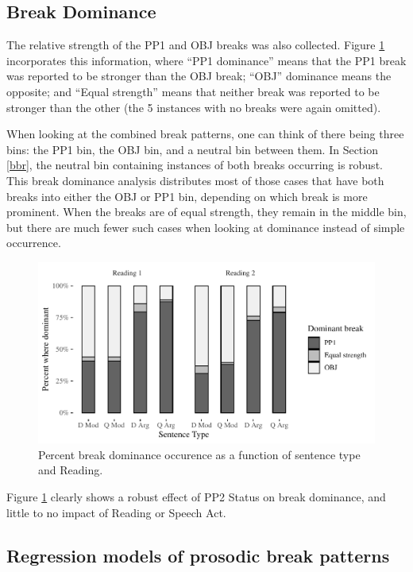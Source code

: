 \documentclass[12pt,oneside]{book}
\begin{document}
\hypertarget{break-dominance}{%
\subsection{Break Dominance}\label{break-dominance}}

The relative strength of the PP1 and OBJ breaks was also collected. Figure \ref{fig:bdom} incorporates this information, where ``PP1 dominance'' means that the PP1 break was reported to be stronger than the OBJ break; ``OBJ'' dominance means the opposite; and ``Equal strength'' means that neither break was reported to be stronger than the other (the 5 instances with no breaks were again omitted).

When looking at the combined break patterns, one can think of there being three bins: the PP1 bin, the OBJ bin, and a neutral bin between them. In Section \ref{bbr}, the neutral bin containing instances of both breaks occurring is robust. This break dominance analysis distributes most of those cases that have both breaks into either the OBJ or PP1 bin, depending on which break is more prominent. When the breaks are of equal strength, they remain in the middle bin, but there are much fewer such cases when looking at dominance instead of simple occurrence.

\begin{figure}
\centering
\includegraphics{4-results_files/figure-latex/bdom-1.pdf}
\caption{\label{fig:bdom}Percent break dominance occurence as a function of sentence type and Reading.}
\end{figure}

Figure \ref{fig:bdom} clearly shows a robust effect of PP2 Status on break dominance, and little to no impact of Reading or Speech Act.

\hypertarget{regression-models-of-prosodic-break-patterns}{%
\subsection{Regression models of prosodic break patterns}\label{regression-models-of-prosodic-break-patterns}}
\end{document}
